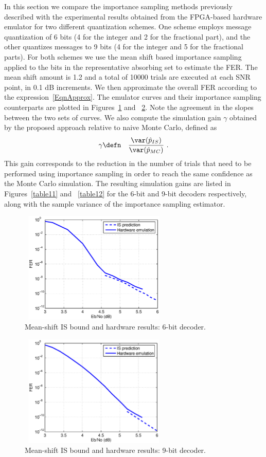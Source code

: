 \vspace{0in} In this section we compare the importance sampling
methods previously described with the experimental results obtained
from the FPGA-based hardware emulator \cite{zhang06} for two different
quantization schemes. One scheme employs message quantization of 6
bits (4 for the integer and 2 for the fractional part), and the other
quantizes messages to 9 bits (4 for the integer and 5 for the
fractional parts). For both schemes we use the mean shift based
importance sampling applied to the bits in the representative
absorbing set to estimate the FER. The mean shift amount is 1.2 and a
total of 10000 trials are executed at each SNR point, in 0.1 dB
increments. We then approximate the overall FER according to the
expression~\eqref{EqnApprox}. The emulator curves and their importance
sampling counterparts are plotted in Figures~\ref{exp1} and
~\ref{exp2}.  Note the agreement in the slopes between the two sets of
curves.  We also compute the simulation gain $\gamma$ obtained by the
proposed approach relative to naive Monte Carlo, defined as~\cite{srini}
\begin{eqnarray*}
\gamma & \defn & \frac{\var(\hat{p}_{IS})}{\var(\hat{p}_{MC})}~.
\end{eqnarray*}
This gain corresponds to the reduction in the number of trials that
need to be performed using importance sampling in order to reach the
same confidence as the Monte Carlo simulation. The resulting
simulation gains are listed in Figures~\ref{table11} and
~\ref{table12} for the 6-bit and 9-bit decoders respectively, along
with the sample variance of the importance sampling estimator.
\begin{figure}
\vspace{0.0in}\includegraphics[width=2.8in,height=2.1in]{itwfig6_0619.eps}
\caption{Mean-shift IS bound and hardware results: 6-bit decoder.
}\label{exp1}
\end{figure}
\begin{figure}
\vspace{0.0in}\includegraphics[width=2.8in,height=2.1in]{itwfig7_0619.eps}
\caption{Mean-shift IS bound and hardware results: 9-bit decoder.
}\label{exp2}
\end{figure}

